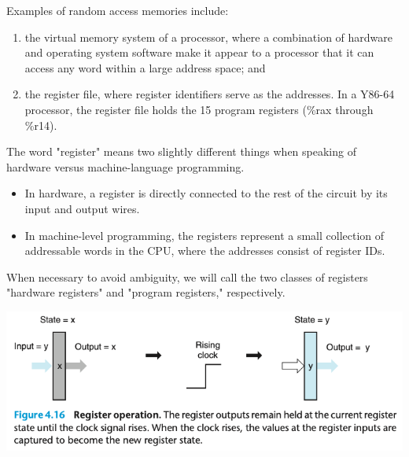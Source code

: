 \documentclass[11pt]{article}
\begin{document}
Examples of random access memories include:\\
\begin{enumerate}
\item the virtual memory system of a processor, where a combination of hardware and operating system software make it appear to a processor that it can access any word within a large address space; and\\
\item the register file, where register identifiers serve as the addresses. In a Y86-64 processor, the register file holds the 15 program registers (\%rax through \%r14).\\
\end{enumerate}


The word "register" means two slightly different things when speaking of hardware versus machine-language programming.\\
\begin{itemize}
\item In hardware, a register is directly connected to the rest of the circuit by its input and output wires.\\
\item In machine-level programming, the registers represent a small collection of addressable words in the CPU, where the addresses consist of register IDs.\\
\end{itemize}

When necessary to avoid ambiguity, we will call the two classes of registers "hardware registers" and "program registers," respectively.\\

\begin{center}
\includegraphics[width=.9\linewidth]{pics/figure4.16-register-operation.png}
\end{center}
\end{document}
